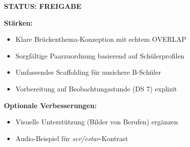 \documentclass[11pt,a4paper]{article}
\begin{document}
\begin{scorebox}
\vspace{1em}
\textcolor{successgreen}{\textbf{STATUS: FREIGABE}}

\vspace{1em}
\textbf{Stärken:}
\begin{itemize}
    \item Klare Brückenthema-Konzeption mit echtem OVERLAP
    \item Sorgfältige Paarzuordnung basierend auf Schülerprofilen
    \item Umfassendes Scaffolding für unsichere B-Schüler
    \item Vorbereitung auf Beobachtungsstunde (DS 7) explizit
\end{itemize}

\textbf{Optionale Verbesserungen:}
\begin{itemize}
    \item Visuelle Unterstützung (Bilder von Berufen) ergänzen
    \item Audio-Beispiel für \textit{ser/estar}-Kontrast
\end{itemize}

\end{scorebox}
\end{document}
